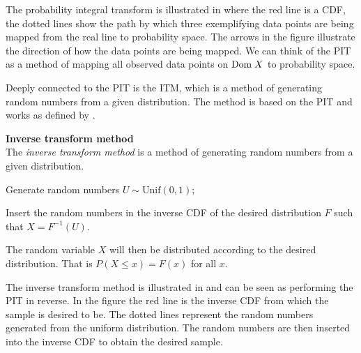 The probability integral transform is illustrated in  where the red line is a \gls{CDF}, the dotted lines show the path by which three exemplifying data points are being mapped from the real line to probability space. The arrows in the figure illustrate the direction of how the data points are being mapped. We can think of the \gls{PIT} as a method of mapping all observed data points on $\mathrm{Dom \;} X$ to probability space.

Deeply connected to the \gls{PIT} is the \gls{ITM}, which is a method of generating random numbers from a given distribution. The method is based on the \gls{PIT} and works as defined by .
\begin{definition}\label{def:InverseTransformMethod}
    \textbf{Inverse transform method} \\
    The \emph{inverse transform method} is a method of generating random numbers from a given distribution.
    \begin{compactenum}
        \item Generate random numbers $U \sim \mathrm{Unif}(0,1)$;
        \item Insert the random numbers in the inverse \gls{CDF} of the desired distribution $F$ such that $X = F^{-1}(U)$.
    \end{compactenum}
    The random variable $X$ will then be distributed according to the desired distribution. That is $P(X\leq x) = F(x)$ for all $x$.
\end{definition}

The inverse transform method is illustrated in  and can be seen as performing the \gls{PIT} in reverse. In the figure the red line is the inverse \gls{CDF} from which the sample is desired to be. The dotted lines represent the random numbers generated from the uniform distribution. The random numbers are then inserted into the inverse \gls{CDF} to obtain the desired sample.

